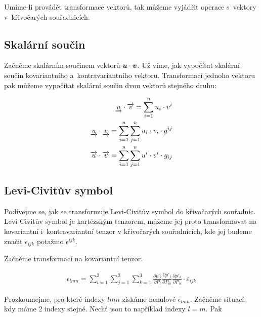 Umíme-li provádět transformace vektorů, tak můžeme vyjádřit operace s~vektory v~křivočarých souřadnicích. 

\subsection{Skalární součin}

Začněme skalárním součinem vektorů \(\boldsymbol{u} \cdot \boldsymbol{v}\). Už víme, jak vypočítat skalární součin kovariantního a~kontravariantního vektoru. Transformací jednoho vektoru pak můžeme vypočítat skalární součin dvou vektorů stejného druhu:

\begin{fact}
\begin{equation}
\begin{split}
\underrightarrow{u} \cdot \overrightarrow{v} = \sum_{i=1}^n u_i \cdot v^i \\
\underrightarrow{u} \cdot \underrightarrow{v} = \sum_{i=1}^n \sum_{j=1}^n u_i \cdot v_i \cdot g^{ij} \\
\overrightarrow{u} \cdot \overrightarrow{v} = \sum_{i=1}^n \sum_{j=1}^n u^i \cdot v^i \cdot g_{ij}
\end{split}
\end{equation}
\end{fact}

\subsection{Levi-Civitův symbol}

Podívejme se, jak se transformuje Levi-Civitův symbol do křivočarých souřadnic. Levi-Civitův symbol je kartézským tenzorem, můžeme jej proto transformovat na kovariantní i~kontravariantní tenzor v křivočarých souřadnicích, kde jej budeme značit \(\epsilon_{ijk}\) potažmo \(\epsilon^{ijk}\).

Začněme transformací na kovariantní tenzor. 

\begin{equation}
\begin{split}
\epsilon_{lmn} = \sum_{i=1}^3 \sum_{j=1}^3 \sum_{k=1}^3 \frac{\partial p'_i}{\partial P_l} \frac{\partial p'_j}{\partial P_m} \frac{\partial p'_k}{\partial P_n} \cdot \varepsilon_{ijk}
\end{split}
\end{equation}

Prozkoumejme, pro které indexy \(lmn\) získáme nenulové \(\epsilon_{lmn}\). Začněme situací, kdy máme 2 indexy stejné. Nechť jsou to například indexy \(l = m\). Pak


